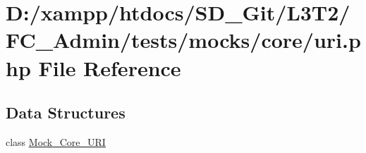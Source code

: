 \hypertarget{tests_2mocks_2core_2_u_r_i_8php}{}\section{D\+:/xampp/htdocs/\+S\+D\+\_\+\+Git/\+L3\+T2/\+F\+C\+\_\+\+Admin/tests/mocks/core/uri.php File Reference}
\label{tests_2mocks_2core_2_u_r_i_8php}
\subsection*{Data Structures}
\begin{DoxyCompactItemize}
\item 
class \hyperlink{class_mock___core___u_r_i}{Mock\+\_\+\+Core\+\_\+\+U\+R\+I}
\end{DoxyCompactItemize}
